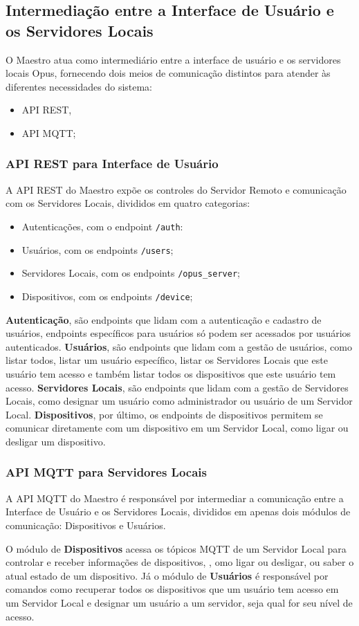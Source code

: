 \subsection{Intermediação entre a Interface de Usuário e os Servidores Locais}
\label{sec:maestro-intermediacao}

O Maestro atua como intermediário entre a interface de usuário e os servidores locais Opus,
fornecendo dois meios de comunicação distintos para atender às diferentes necessidades do sistema:
\begin{itemize}
    \item API REST,
    \item API MQTT;
\end{itemize}

\subsubsection{API REST para Interface de Usuário}
A API REST do Maestro expõe os controles do Servidor Remoto e comunicação com os Servidores Locais, divididos em quatro categorias:
\begin{itemize}
    \item Autenticações, com o endpoint \lstinline{/auth}:
    \item Usuários, com os endpoints \lstinline{/users};
    \item Servidores Locais, com os endpoints \lstinline{/opus_server};
    \item Dispositivos, com os endpoints \lstinline{/device};
\end{itemize}

\textbf{Autenticação}, são endpoints que lidam com a autenticação e cadastro de usuários, endpoints específicos para usuários
só podem ser acessados por usuários autenticados.
\textbf{Usuários}, são endpoints que lidam com a gestão de usuários, como listar todos, listar um usuário específico, listar os Servidores Locais
que este usuário tem acesso e também listar todos os dispositivos que este usuário tem acesso.
\textbf{Servidores Locais}, são endpoints que lidam com a gestão de Servidores Locais, como designar um usuário como administrador ou usuário de um Servidor Local.
\textbf{Dispositivos}, por último, os endpoints de dispositivos permitem se comunicar diretamente com um dispositivo em um Servidor Local, 
como ligar ou desligar um dispositivo.

\subsubsection{API MQTT para Servidores Locais}
A API MQTT do Maestro é responsável por intermediar a comunicação entre a Interface de Usuário e os Servidores Locais, divididos em apenas dois módulos de 
comunicação: Dispositivos e Usuários.

O módulo de \textbf{Dispositivos} acessa os tópicos MQTT de um Servidor Local para controlar e receber informações de dispositivos, ,
omo ligar ou desligar, ou saber o atual estado de um dispositivo. 
Já o módulo de \textbf{Usuários} é responsável por comandos como recuperar todos os dispositivos que um usuário tem acesso em um Servidor Local e 
designar um usuário a um servidor, seja qual for seu nível de acesso.